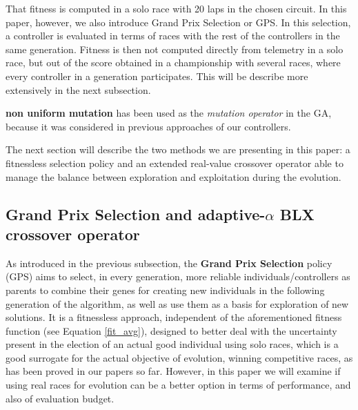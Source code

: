 \documentclass[10pt,journal,compsoc]{IEEEtran}
\begin{document}
That fitness is computed in a solo race with 20 laps in the chosen circuit. In this paper, however, we also introduce Grand Prix Selection or GPS. In this
selection, a controller is evaluated in terms of races with the rest
of the controllers in the same generation. Fitness is then not
computed directly from telemetry in a solo race, but out of the score
obtained in a championship with several races, where every controller
in a generation participates. This will be describe more extensively
in the next subsection.

\textbf{non uniform mutation} \cite{mutation1997} has been used as the
\textit{mutation operator} in the GA, because it was considered in
previous approaches of our controllers. 

The next section will describe the two methods we are presenting in
this paper: a fitnessless selection policy and an extended real-value
crossover operator able to manage the balance between exploration and
exploitation during the evolution. 

\subsection{Grand Prix Selection and adaptive-$\alpha$ BLX crossover operator}
\label{subsec:novel_operators}



As introduced in the previous subsection, the \textbf{Grand Prix Selection} policy (GPS)  aims to select, in every generation, more reliable individuals/controllers as parents to combine their genes for creating new individuals in the following generation of the algorithm, as well as use them as a basis for exploration of new solutions. It is a fitnessless approach,
independent of the aforementioned fitness function (see Equation
\ref{fit_avg}), designed to better deal with the uncertainty present
in the election of an actual good individual using solo races, which
is a good surrogate for the actual objective of evolution, winning
competitive races, as has been proved in our papers so far. However,
in this paper we will examine if using real races for evolution can be
a better option in terms of performance, and also of evaluation
budget. 
\end{document}
